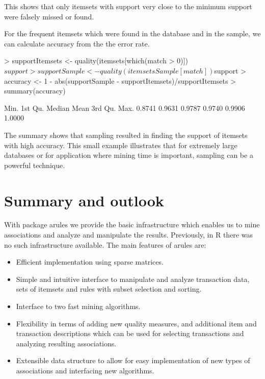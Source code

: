 \documentclass[10pt,a4paper]{article}
\newcommand{\strong}[1]{{\normalfont\fontseries{b}\selectfont #1}}
\newcommand{\pkg}[1]{\strong{#1}}
\newcommand{\proglang}[1]{\textsf{#1}}
\begin{document}
This shows that only itemsets with support very close to the minimum support
were falsely missed or found.

For the frequent itemsets which were found in the database and in the
sample, we can calculate accuracy from the the error rate.

\begin{Schunk}
\begin{Sinput}
> supportItemsets <- quality(itemsets[which(match > 0)])$support
> supportSample <- quality(itemsetsSample[match])$support
> accuracy <- 1 - abs(supportSample - supportItemsets)/supportItemsets
> summary(accuracy)
\end{Sinput}
\begin{Soutput}
   Min. 1st Qu.  Median    Mean 3rd Qu.    Max. 
 0.8741  0.9631  0.9787  0.9740  0.9906  1.0000 
\end{Soutput}
\end{Schunk}

The summary shows that sampling resulted in finding the support of itemsets
with high accuracy. This small example illustrates 
that for extremely large databases or for application where mining time 
is important, sampling can be a powerful technique.



\section{Summary and outlook\label{sec:conclusion}}

With package \pkg{arules} we
provide the basic infrastructure which enables us to 
mine associations and analyze and manipulate the results. 
Previously, in \proglang{R} there was no such infrastructure available.
The main features of \pkg{arules} are:

\begin{itemize}
 \item Efficient implementation using sparse matrices.
 \item Simple and intuitive interface to manipulate and analyze
  transaction data, sets of itemsets and rules with subset selection and
  sorting.
 \item Interface to two fast mining algorithms.
 \item Flexibility in terms of adding new quality measures, and
  additional item and transaction descriptions which can be used for
  selecting transactions and analyzing resulting associations.
 \item Extensible data structure to allow for easy implementation of new
  types of associations and interfacing new algorithms.
\end{itemize}
\end{document}
